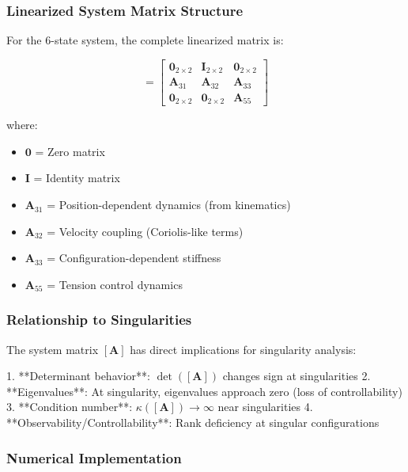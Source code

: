 \subsubsection{Linearized System Matrix Structure}

For the 6-state system, the complete linearized matrix is:

\begin{equation}
[\mathbf{A}] = \begin{bmatrix}
\mathbf{0}_{2 \times 2} & \mathbf{I}_{2 \times 2} & \mathbf{0}_{2 \times 2} \\
\mathbf{A}_{31} & \mathbf{A}_{32} & \mathbf{A}_{33} \\
\mathbf{0}_{2 \times 2} & \mathbf{0}_{2 \times 2} & \mathbf{A}_{55}
\end{bmatrix}
\end{equation}

where:
\begin{itemize}
    \item $\mathbf{0}$ = Zero matrix
    \item $\mathbf{I}$ = Identity matrix
    \item $\mathbf{A}_{31}$ = Position-dependent dynamics (from kinematics)
    \item $\mathbf{A}_{32}$ = Velocity coupling (Coriolis-like terms)
    \item $\mathbf{A}_{33}$ = Configuration-dependent stiffness
    \item $\mathbf{A}_{55}$ = Tension control dynamics
\end{itemize}

\subsubsection{Relationship to Singularities}

The system matrix $[\mathbf{A}]$ has direct implications for singularity analysis:

1. **Determinant behavior**: $\det([\mathbf{A}])$ changes sign at singularities
2. **Eigenvalues**: At singularity, eigenvalues approach zero (loss of controllability)
3. **Condition number**: $\kappa([\mathbf{A}]) \to \infty$ near singularities
4. **Observability/Controllability**: Rank deficiency at singular configurations

\subsubsection{Numerical Implementation}

